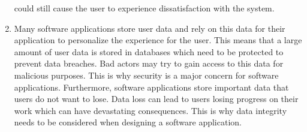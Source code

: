 \documentclass{article}
\begin{document}
\begin{enumerate}
    could still cause the user to experience dissatisfaction with the system. 
    \item Many software applications store user data and rely on this data for their application to personalize the experience for the user. This means that a large amount of user data is stored in databases which need to
    be protected to prevent data breaches. Bad actors may try to gain access to this data for malicious purposes. This is why security is a major concern for software applications. Furthermore, software applications store
    important data that users do not want to lose. Data loss can lead to users losing progress on their work which can have devastating consequences. This is why data integrity needs to be considered when designing a 
    software application. 
\end{enumerate}
\end{document}
